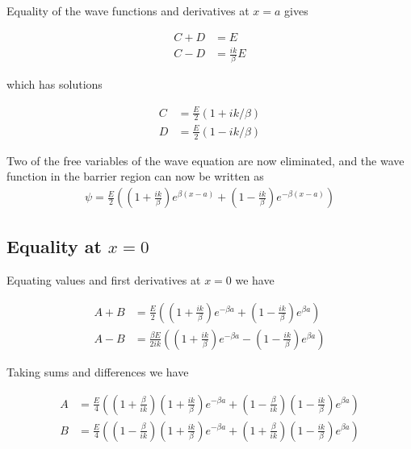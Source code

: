 \documentclass{article}
\begin{document}
Equality of the wave functions and derivatives at $x=a$ gives

\begin{align*}
C + D &= E \\
C - D &= \frac{i k}{\beta}E
\end{align*}

which has solutions

\begin{align*}
C &= \frac{E}{2}( 1 + i k/\beta ) \\
D &= \frac{E}{2}( 1 - i k/\beta )
\end{align*}

Two of the free variables of the wave equation are now eliminated, and the wave function in the barrier region can now be written as
\begin{align}\label{eqn:psiInBarrier}
\psi =
\frac{E}{2}\left( \left( 1 + \frac{i k}{\beta} \right) e^{ \beta(x-a)} + \left( 1 - \frac{i k}{\beta} \right) e^{ -\beta(x-a)} \right)
\end{align}

\subsection{ Equality at $x=0$ }

Equating values and first derivatives at $x=0$ we have

\begin{align*}
A + B &=
\frac{E}{2}\left( \left( 1 + \frac{i k}{\beta} \right) e^{ -\beta a} + \left( 1 - \frac{i k}{\beta} \right) e^{ \beta a } \right) \\
A - B &=
\frac{\beta E}{2 i k}\left( \left( 1 + \frac{i k}{\beta} \right) e^{ -\beta a} - \left( 1 - \frac{i k}{\beta} \right) e^{ \beta a } \right)
\end{align*}

Taking sums and differences we have

\begin{align*}
A &= \frac{E}{4}\left( \left(1 + \frac{\beta}{ik}\right)\left( 1 + \frac{i k}{\beta} \right) e^{ -\beta a} + \left(1 - \frac{\beta}{ik}\right)\left( 1 - \frac{i k}{\beta} \right) e^{ \beta a } \right) \\
B &= \frac{E}{4}\left( \left(1 - \frac{\beta}{ik}\right)\left( 1 + \frac{i k}{\beta} \right) e^{ -\beta a} + \left(1 + \frac{\beta}{ik}\right)\left( 1 - \frac{i k}{\beta} \right) e^{ \beta a } \right) \\
\end{align*}
\end{document}
